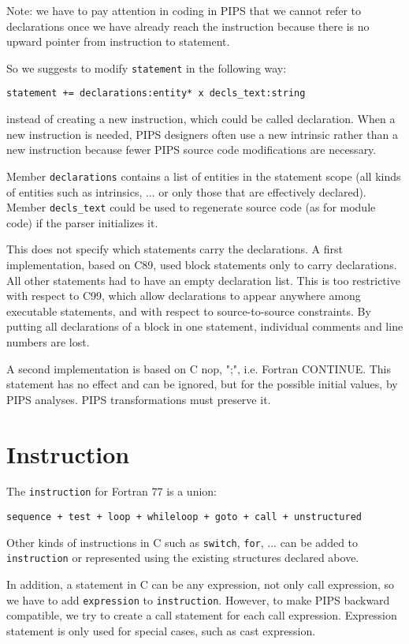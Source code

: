\documentclass[a4paper]{report}
\begin{document}
Note: we have to pay attention in coding in PIPS that we cannot refer
to declarations once we have already reach the instruction because
there is no upward pointer from instruction to statement.

So we suggests to modify \verb/statement/ in the following way:

\verb/statement += declarations:entity* x decls_text:string/

instead of creating a new instruction, which could be called
declaration. When a new instruction is needed, PIPS designers often
use a new intrinsic rather than a new instruction because fewer PIPS
source code modifications are necessary.

Member \verb/declarations/ contains a list of entities in the
statement scope (all kinds of entities such as intrinsics, ... or only
those that are effectively declared).  Member \verb/decls_text/ could
be used to regenerate source code (as for module code) if the parser
initializes it.

This does not specify which statements carry the declarations. A first
implementation, based on C89, used block statements only to carry
declarations. All other statements had to have an empty declaration
list. This is too restrictive with respect to C99, which allow
declarations to appear anywhere among executable statements, and with
respect to source-to-source constraints. By putting all declarations
of a block in one statement, individual comments and line numbers are
lost.

A second implementation is based on C nop, ";", i.e. Fortran
CONTINUE. This statement has no effect and can be ignored, but for the
possible initial values, by PIPS analyses. PIPS transformations must
preserve it.

\section{Instruction}

The \verb/instruction/ for Fortran 77 is a union:

\verb/sequence + test + loop + whileloop + goto + call + unstructured/

Other kinds of instructions in C such as \verb/switch/, \verb/for/,
... can be added to \verb/instruction/ or represented using the
existing structures declared above.

In addition, a statement in C can be any expression, not only call
expression, so we have to add \verb/expression/ to \verb/instruction/.
However, to make PIPS backward compatible, we try to create a call
statement for each call expression. Expression statement is only used
for special cases, such as cast expression.
\end{document}
